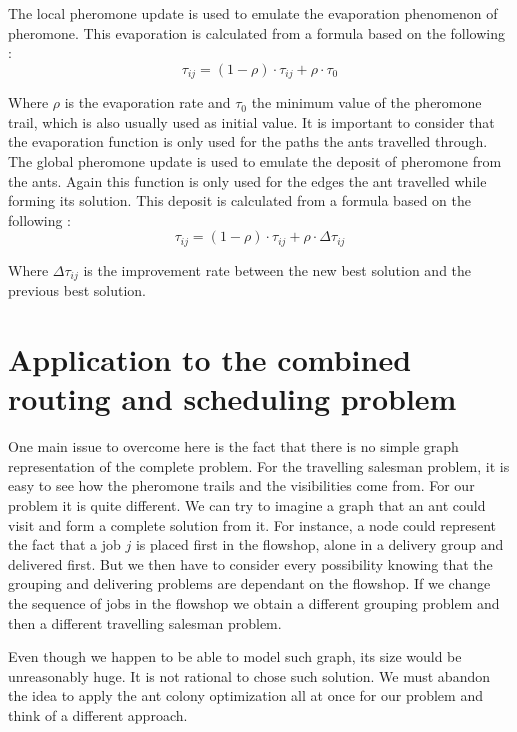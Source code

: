 \documentclass[UTF8, twoside]{EPURapport}
\begin{document}
	The local pheromone update is used to emulate the evaporation phenomenon of pheromone. This evaporation is calculated from a formula based on the following :
	\\
	
\[
\tau_{ij} = (1-\rho) \cdot \tau_{ij}+\rho \cdot \tau_{0}
\]

	Where $\rho$ is the evaporation rate and $\tau_{0}$ the minimum value of the pheromone trail, which is also usually used as initial value. It is important to consider that the evaporation function is only used for the paths the ants travelled through.
\\

	The global pheromone update is used to emulate the deposit of pheromone from the ants. Again this function is only used for the edges the ant travelled while forming its solution. This deposit is calculated from a formula based on the following :
	\\
	
\[
\tau_{ij} = (1-\rho) \cdot \tau_{ij}+\rho \cdot \Delta\tau_{ij}
\]

	Where $\Delta\tau_{ij}$ is the improvement rate between the new best solution and the previous best solution.

\section{Application to the combined routing and scheduling problem}

\label{Ant colony heuristic}

	\hspace{4ex}One main issue to overcome here is the fact that there is no simple graph representation of the complete problem. For the travelling salesman problem, it is easy to see how the pheromone trails and the visibilities come from. For our problem it is quite different. We can try to imagine a graph that an ant could visit and form a complete solution from it. For instance, a node could represent the fact that a job $j$ is placed first in the flowshop, alone in a delivery group and delivered first. But we then have to consider every possibility knowing that the grouping and delivering problems are dependant on the flowshop. If we change the sequence of jobs in the flowshop we obtain a different grouping problem and then a different travelling salesman problem.
	
	Even though we happen to be able to model such graph, its size would be unreasonably huge. It is not rational to chose such solution. We must abandon the idea to apply the ant colony optimization all at once for our problem and think of a different approach.
	\\
	
\end{document}
